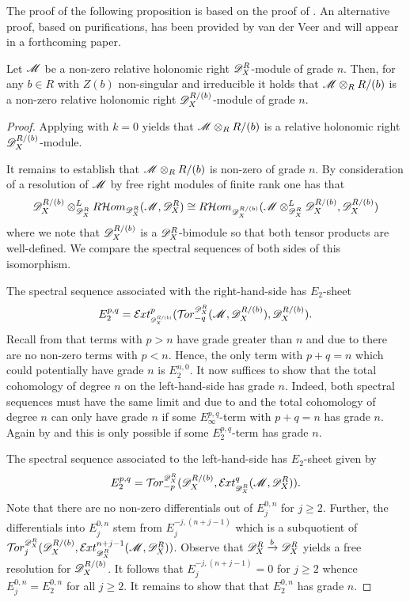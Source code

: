  The proof of the following proposition is based on the proof of \cite[Proposition 3.4.3]{budur2020zeroI}.
 An alternative proof, based on purifications, has been provided by van der Veer and will appear in a forthcoming paper.
 \begin{proposition}\label{prop: RestrictConservesGraden}
   Let $\mathscr{M}$ be a non-zero relative holonomic right $\mathscr{D}_X^R$-module of grade $n$.
   Then, for any $b\in R$ with $Z(b)$ non-singular and irreducible it holds that $\mathscr{M}\otimes_R R/(b)$ is a non-zero relative holonomic right $\mathscr{D}_X^{R/(b)}$-module of grade $n$.
 \end{proposition}\begin{proof}
   Applying  with $k=0$ yields that $\mathscr{M} \otimes_R R/(b)$ is a relative holonomic right $\mathscr{D}_X^{R/(b)}$-module.

  It remains to establish that $\mathscr{M} \otimes_R R/(b)$ is non-zero of grade $n$.
  By consideration of a resolution of $\mathscr{M}$ by free right modules of finite rank one has that
  $$ \mathscr{D}_X^{R/(b)} \otimes_{\mathscr{D}_X^R}^LR\mathcal{H}om_{\mathscr{D}_X^R}(\mathscr{M},\mathscr{D}_X^R) \cong R \mathcal{H}om_{\mathscr{D}_X^{R/(b)} }(\mathscr{M}\otimes_{\mathscr{D}_X^R }^L \mathscr{D}_X^{R/(b)}, \mathscr{D}_X^{R/(b)}) $$
  where we note that $\mathscr{D}_X^{R/(b)}$ is a $\mathscr{D}_X^{R}$-bimodule so that both tensor products are well-defined.
  We compare the spectral sequences of both sides of this isomorphism.

  The spectral sequence associated with the right-hand-side has $E_2$-sheet
  $$E^{p,q}_2 = \Ex{\D_X^{R/(b)}}{p}(\Tr{\D_X^R}{-q}(\M, \D_X^{R/(b)}), \D_X^{R/(b)}).$$
  Recall from  that terms with $p>n$ have grade greater than $n$ and due to  there are no non-zero terms with $p<n$.
  Hence, the only term with $p+q = n$ which could potentially have grade $n$ is $E^{n,0}_2$.
  It now suffices to show that the total cohomology of degree $n$ on the left-hand-side has grade $n$.
  Indeed, both spectral sequences must have the same limit and due to  and  the total cohomology of degree $n$ can only have grade $n$ if some $E^{p,q}_\infty$-term with $p+q=n$ has grade $n$.
  Again by  and  this is only possible if some $E^{p,q}_2$-term has grade $n$.

  The spectral sequence associated to the left-hand-side has $E_2$-sheet given by
  $$E_2^{p,q} =\Tr{\D_X^R}{-p}(\D_X^{R/(b)}, \Ex{\D_X^R}{q}(\M,\D_X^R)).$$
  Note that there are no non-zero differentials out of $E_j^{0,n}$ for $j\geq 2$.
  Further, the differentials into $E^{0,n}_j$ stem from $E^{-j,(n+j-1)}_j$ which is a subquotient of $\Tr{\D_X^R}{j}( \D_X^{R/(b)} ,\Ex{\D_X^R}{n+j-1}(\M, \D_X^R))$.
  Observe that $\mathscr{D}_X^R \xrightarrow{b} \mathscr{D}_X^R $ yields a free resolution for $\mathscr{D}_X^{R/(b)}$.
  It follows that $E^{-j,(n+j-1)}_j=0$ for $j\geq 2$ whence $E_j^{0,n} = E_2^{0,n}$ for all $j\geq 2$.
  It remains to show that that $E_2^{0,n}$ has grade $n$.


\end{proof}
